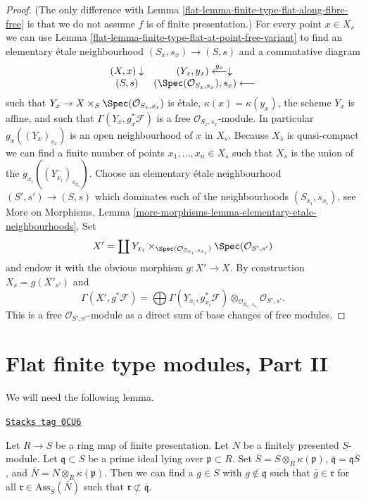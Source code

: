 \begin{proof}

(The only difference with
Lemma \ref{flat-lemma-finite-type-flat-along-fibre-free}
is that we do not assume $f$ is of finite presentation.)
For every point $x \in X_s$ we can use
Lemma \ref{flat-lemma-finite-type-flat-at-point-free-variant}
to find an elementary \'etale neighbourhood $(S_x , s_x) \to (S, s)$
and a commutative diagram
$$
\begin{array}{cc}(X, x) \downarrow & (Y_x, y_x) \overset{g_x}{\longleftarrow}\downarrow \\ (S, s) & (\Spec(\mathcal{O}_{S_x, s_x}), s_x) \longleftarrow\end{array}
$$
such that $Y_x \to X \times_S \Spec(\mathcal{O}_{S_x, s_x})$
is \'etale, $\kappa(x) = \kappa(y_x)$, the scheme $Y_x$ is affine, and
such that $\Gamma(Y_x, g_x^*\mathcal{F})$ is a free
$\mathcal{O}_{S_x, s_x}$-module. In particular
$g_x((Y_x)_{s_x})$ is an open neighbourhood of $x$ in $X_s$.
Because $X_s$ is quasi-compact we can find a finite number of points
$x_1, \ldots, x_n \in X_s$ such that $X_s$ is the union of
the $g_{x_i}((Y_{x_i})_{s_{x_i}})$. Choose an elementary \'etale neighbourhood
$(S' , s') \to (S, s)$ which dominates each of the neighbourhoods
$(S_{x_i}, s_{x_i})$, see
More on Morphisms,
Lemma \ref{more-morphisms-lemma-elementary-etale-neighbourhoods}.
Set
$$
X' = \coprod Y_{x_i} \times_{\Spec(\mathcal{O}_{S_{x_i}, s_{x_i}})}
\Spec(\mathcal{O}_{S', s'})
$$
and endow it with the obvious morphism $g : X' \to X$.
By construction $X_s = g(X'_{s'})$ and
$$
\Gamma(X', g^*\mathcal{F})
=
\bigoplus \Gamma(Y_{x_i}, g_{x_i}^*\mathcal{F})
\otimes_{\mathcal{O}_{S_{x_i}, s_{x_i}}}
\mathcal{O}_{S', s'}.
$$
This is a free $\mathcal{O}_{S', s'}$-module as a direct sum
of base changes of free modules.
\end{proof}

\section{Flat finite type modules, Part II}
\label{flat-section-finite-type-flat-II}
We will need the following lemma.

\begin{lemma}
\label{flat-lemma-weak-bourbaki-pre-pre}
\href{https://stacks.math.columbia.edu/tag/0CU6}{\texttt{Stacks tag 0CU6}}

Let $R \to S$ be a ring map of finite presentation. Let $N$ be a
finitely presented $S$-module. Let $\mathfrak q \subset S$ be a prime ideal
lying over $\mathfrak p \subset R$. Set
$\overline{S} = S \otimes_R \kappa(\mathfrak p)$,
$\overline{\mathfrak q} = \mathfrak q \overline{S}$, and
$\overline{N} = N \otimes_R \kappa(\mathfrak p)$. Then
we can find a $g \in S$ with
$g \not \in \mathfrak q$ such that
$\overline{g} \in \mathfrak r$ for all
$\mathfrak r \in \text{Ass}_{\overline{S}}(\overline{N})$
such that $\mathfrak r \not \subset \overline{\mathfrak q}$.
\end{lemma}

